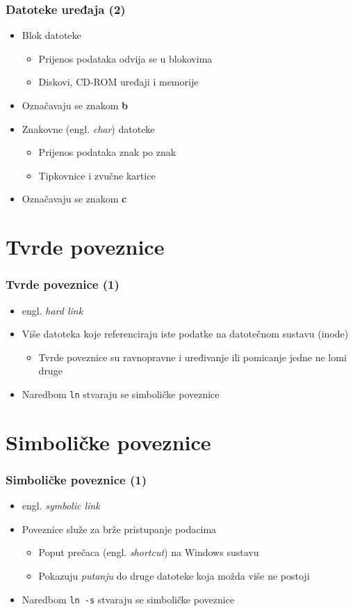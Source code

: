 \documentclass{beamer}
\newcommand{\shell}[1]{\texttt{\small #1}}
\begin{document}
\begin{frame}[t]
\frametitle{Datoteke uređaja (2)}
\begin{itemize}
  \item Blok datoteke
  \begin{itemize}
    \item Prijenos podataka odvija se u blokovima
    \item Diskovi, CD-ROM uređaji i memorije
  \end{itemize}
  \item Označavaju se znakom \textbf{b}
  \item Znakovne (engl. \emph{char}) datoteke
  \begin{itemize}
    \item Prijenos podataka znak po znak
    \item Tipkovnice i zvučne kartice
  \end{itemize}
  \item Označavaju se znakom \textbf{c}
\end{itemize}
\end{frame}

\section{Tvrde poveznice}
\begin{frame}[t]
\frametitle{Tvrde poveznice (1)}
\begin{itemize}
  \item engl. \emph{hard link}
  \item Više datoteka koje referenciraju iste podatke na datotečnom sustavu (inode)
  \begin{itemize}
    \item Tvrde poveznice su ravnopravne i uređivanje ili pomicanje jedne ne lomi druge
  \end{itemize}
  \item Naredbom \shell{ln} stvaraju se simboličke poveznice
\end{itemize}
\end{frame}

\section{Simboličke poveznice}
\begin{frame}[t]
\frametitle{Simboličke poveznice (1)}
\begin{itemize}
  \item engl. \emph{symbolic link}
  \item Poveznice služe za brže pristupanje podacima
  \begin{itemize}
    \item Poput prečaca (engl. \emph{shortcut}) na Windows sustavu
		\item Pokazuju \emph{putanju} do druge datoteke koja možda više ne postoji
  \end{itemize}
  \item Naredbom \shell{ln -s} stvaraju se simboličke poveznice
\end{itemize}
\end{frame}
\end{document}
